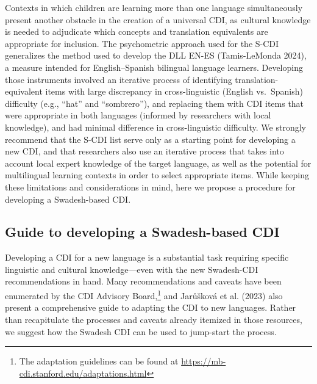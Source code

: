 \documentclass[
  letterpaper,
  DIV=11,
  numbers=noendperiod]{scrartcl}
\begin{document}
Contexts in which children are learning more than one language
simultaneously present another obstacle in the creation of a universal
CDI, as cultural knowledge is needed to adjudicate which concepts and
translation equivalents are appropriate for inclusion. The psychometric
approach used for the S-CDI generalizes the method used to develop the
DLL EN-ES (Tamis-LeMonda 2024), a measure intended for English--Spanish
bilingual language learners. Developing those instruments involved an
iterative process of identifying translation-equivalent items with large
discrepancy in cross-linguistic (English vs.~Spanish) difficulty (e.g.,
``hat'' and ``sombrero''), and replacing them with CDI items that were
appropriate in both languages (informed by researchers with local
knowledge), and had minimal difference in cross-linguistic difficulty.
We strongly recommend that the S-CDI list serve only as a starting point
for developing a new CDI, and that researchers also use an iterative
process that takes into account local expert knowledge of the target
language, as well as the potential for multilingual learning contexts in
order to select appropriate items. While keeping these limitations and
considerations in mind, here we propose a procedure for developing a
Swadesh-based CDI.

\subsection{Guide to developing a Swadesh-based
CDI}\label{guide-to-developing-a-swadesh-based-cdi}

Developing a CDI for a new language is a substantial task requiring
specific linguistic and cultural knowledge---even with the new
Swadesh-CDI recommendations in hand. Many recommendations and caveats
have been enumerated by the CDI Advisory Board,\footnote{The adaptation 
guidelines can be found at \url{https://mb-cdi.stanford.edu/adaptations.html}}
and Jarůšková et al. (2023) also present a comprehensive guide to
adapting the CDI to new languages. Rather than recapitulate the
processes and caveats already itemized in those resources, we suggest
how the Swadesh CDI can be used to jump-start the process.
\end{document}
